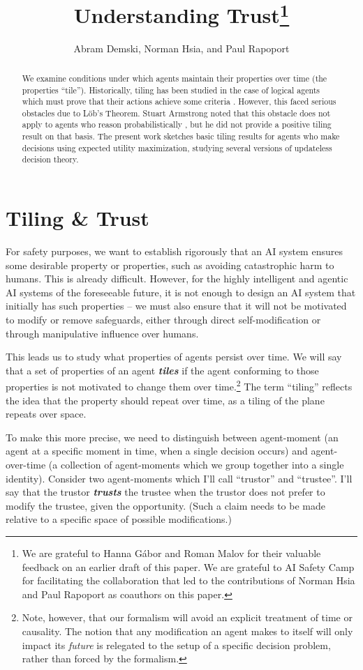 \documentclass{article}
\title{Understanding Trust\footnote{We are grateful to Hanna Gábor and Roman Malov for their valuable feedback on an earlier draft of this paper. We are grateful to AI Safety Camp for facilitating the collaboration that led to the contributions of Norman Hsia and Paul Rapoport as coauthors on this paper.}}
\author{Abram Demski, Norman Hsia, and Paul Rapoport}
\begin{document}
\maketitle

\begin{abstract}
We examine conditions under which agents maintain their properties over time (the properties ``tile''). Historically, tiling has been studied in the case of logical agents which must prove that their actions achieve some criteria \cite{yudkowsky2013tiling}. However, this faced serious obstacles due to L\"ob's Theorem. Stuart Armstrong noted that this obstacle does not apply to agents who reason probabilistically \cite{armstrong2013loeb}, but he did not provide a positive tiling result on that basis. The present work sketches basic tiling results for agents who make decisions using expected utility maximization, studying several versions of updateless decision theory.
\end{abstract}

\section{Tiling \& Trust}

For safety purposes, we want to establish rigorously that an AI system ensures some desirable property or properties, such as avoiding catastrophic harm to humans. This is already difficult. However, for the highly intelligent and agentic AI systems of the foreseeable future, it is not enough to design an AI system that initially has such properties -- we must also ensure that it will not be motivated to modify or remove safeguards, either through direct self-modification or through manipulative influence over humans.

This leads us to study what properties of agents persist over time. We will say that a set of properties of an agent \textit{\textbf{tiles}} if the agent conforming to those properties is not motivated to change them over time.\footnote{Note, however, that our formalism will avoid an explicit treatment of time or causality. The notion that any modification an agent makes to itself will only impact its \emph{future} is relegated to the setup of a specific decision problem, rather than forced by the formalism.} The term ``tiling'' reflects the idea that the property should repeat over time, as a tiling of the plane repeats over space.

To make this more precise, we need to distinguish between agent-moment (an agent at a specific moment in time, when a single decision occurs) and agent-over-time (a collection of agent-moments which we group together into a single identity). Consider two agent-moments which I'll call ``trustor'' and ``trustee''. I'll say that the trustor \textit{\textbf{trusts}} the trustee when the trustor does not prefer to modify the trustee, given the opportunity. (Such a claim needs to be made relative to a specific space of possible modifications.)
\end{document}
